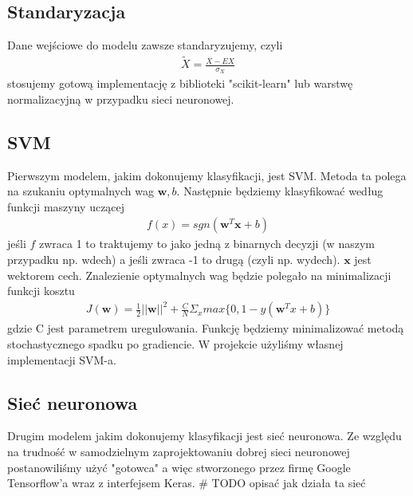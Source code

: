 \documentclass[polish]{article}
\begin{document}
\subsection{Standaryzacja}
Dane wejściowe do modelu zawsze standaryzujemy, czyli
\begin{gather*}
	\tilde X = \frac{X - EX}{\sigma_X}
\end{gather*}
stosujemy gotową implementację z biblioteki "scikit-learn" lub warstwę normalizacyjną w przypadku sieci neuronowej.
\subsection{SVM}
Pierwszym modelem, jakim dokonujemy klasyfikacji, jest SVM. Metoda ta polega na szukaniu optymalnych wag $\boldsymbol{w}, b$.
Następnie będziemy klasyfikować według funkcji maszyny uczącej 
\begin{gather*}
	f(x) = sgn(\boldsymbol{w}^T \boldsymbol{x} + b)
\end{gather*}
jeśli $f$ zwraca 1 to traktujemy to jako jedną z binarnych decyzji (w naszym przypadku np. wdech) a jeśli zwraca -1 to drugą (czyli np. wydech).
$\textbf{x}$ jest wektorem cech.  Znalezienie optymalnych wag będzie polegało na minimalizacji
funkcji kosztu
\begin{gather*}
	J(\boldsymbol{w}) = \frac{1}{2}||\boldsymbol{w}||^2 + \frac{C}{N}\Sigma_x max\{0, 1 - y(\boldsymbol{w}^Tx + b)\}
\end{gather*}
gdzie C jest parametrem uregulowania. Funkcję będziemy minimalizować metodą stochastycznego spadku po gradiencie.
W projekcie użyliśmy własnej implementacji SVM-a.
\subsection{Sieć neuronowa}
Drugim modelem jakim dokonujemy klasyfikacji jest sieć neuronowa. Ze względu na trudność w samodzielnym zaprojektowaniu dobrej sieci neuronowej postanowiliśmy użyć "gotowca" a więc stworzonego przez firmę Google Tensorflow'a wraz z interfejsem Keras. \# TODO opisać jak działa ta sieć
\end{document}
